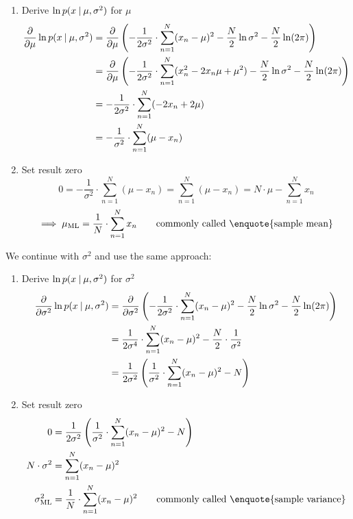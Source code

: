 \documentclass[a4paper]{article}
\newcommand\given{
  \nonscript\:
  \vert
  \nonscript\:
  \mathopen{}
  \allowbreak
}
\begin{document}
\begin{enumerate}
  \item Derive $\ln{p(x \given \mu, \sigma^2)}$ for $\mu$
    \begin{align*}
      \frac\partial{\partial \mu} \ln{p(x \given \mu, \sigma^2)}
      &= \frac\partial{\partial \mu} \left(-\frac{1}{2\sigma^2} \cdot \sum_{n=1}^N (x_n - \mu)^2 - \frac{N}{2} \ln{\sigma^2} - \frac{N}{2} \ln(2\pi)\right) \\
      &= \frac\partial{\partial \mu} \left(-\frac{1}{2\sigma^2} \cdot \sum_{n=1}^N (x_n^2 - 2 x_n \mu + \mu^2) - \frac{N}{2} \ln{\sigma^2} - \frac{N}{2} \ln(2\pi)\right) \\
      &= -\frac{1}{2\sigma^2} \cdot \sum_{n=1}^N (-2x_n + 2\mu) \\
      &= -\frac1{\sigma^2} \cdot \sum_{n=1}^N (\mu - x_n)
    \end{align*}
  \item Set result zero
    \[ 0 = -\frac{1}{\sigma^2} \cdot \sum_{n=1}^N (\mu - x_n) = \sum_{n=1}^N (\mu - x_n) = N \cdot \mu - \sum_{n=1}^N x_n \]
    \[ \implies \mu_{\text{ML}} = \frac1N \cdot \sum_{n=1}^N x_n \qquad \text{commonly called \enquote{sample mean}} \]
\end{enumerate}

We continue with $\sigma^2$ and use the same approach:

\begin{enumerate}
  \item Derive $\ln{p(x \given \mu, \sigma^2)}$ for $\sigma^2$
    \begin{align*}
      \frac{\partial}{\partial \sigma^2} \ln{p(x \given \mu, \sigma^2)}
      &= \frac{\partial}{\partial \sigma^2} \left(-\frac{1}{2\sigma^2} \cdot \sum_{n=1}^N (x_n - \mu)^2 - \frac{N}2 \ln{\sigma^2} - \frac{N}2 \ln(2\pi)\right) \\
      &= \frac{1}{2\sigma^4} \cdot \sum_{n=1}^N (x_n - \mu)^2 - \frac{N}{2} \cdot \frac{1}{\sigma^2} \\
      &= \frac{1}{2\sigma^2} \left(\frac{1}{\sigma^2} \cdot \sum_{n=1}^N (x_n - \mu)^2 - N\right)
    \end{align*}
  \item Set result zero
    \begin{align*}
      0 &= \frac{1}{2\sigma^2} \left(\frac{1}{\sigma^2} \cdot \sum_{n=1}^N (x_n - \mu)^2 - N\right) \\
      N \cdot \sigma^2 &= \sum_{n=1}^N (x_n - \mu)^2 \\
      \sigma^2_{\text{ML}} &= \frac{1}{N} \cdot \sum_{n=1}^N (x_n - \mu)^2 \qquad \text{commonly called \enquote{sample variance}}
    \end{align*}
\end{enumerate}
\end{document}

